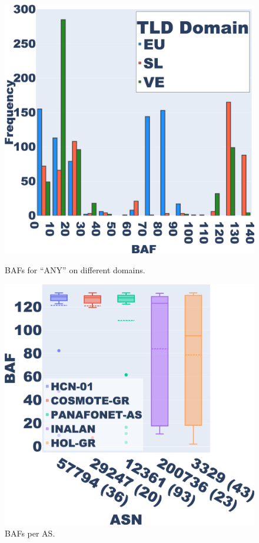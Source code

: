 \captionsetup{font=small}
\begin{figure}[t]
    \centering
    \begin{minipage}[b]{0.2385\textwidth}
        \centering
        \includegraphics[width=\textwidth]{research paper/plots/dns_histogram_comparison_trim.png}
        \caption{BAFs for ``ANY'' on different domains.}
        \label{fig:any_diff_domains}
    \end{minipage}
    \hfill
    \begin{minipage}[b]{0.2385\textwidth}
        \centering
        \includegraphics[width=\textwidth]{research paper/plots/SL_netw_boxplot_restricted_trim.png}
        \caption{BAFs per AS.}
        \label{fig:network_info}
    \end{minipage}
\end{figure}


